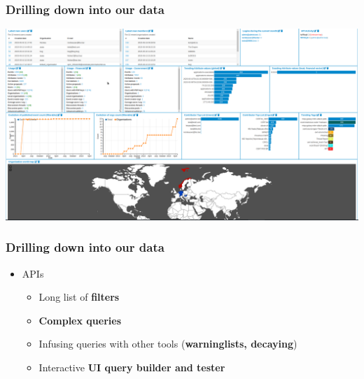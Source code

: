 \begin{frame}
    \frametitle{Drilling down into our data}
        \begin{center}
	    \includegraphics[width=1.05\linewidth]{dashboard-new.png}
        \end{center}
\end{frame}




\begin{frame}
\frametitle{Drilling down into our data}
    \begin{itemize}
        \item APIs
        \begin{itemize}
                \item Long list of {\bf filters}
                \item {\bf Complex queries}
                \item Infusing queries with other tools ({\bf warninglists, decaying})
                \item Interactive {\bf UI query builder and tester}
        \end{itemize}
    \end{itemize}
\end{frame}


